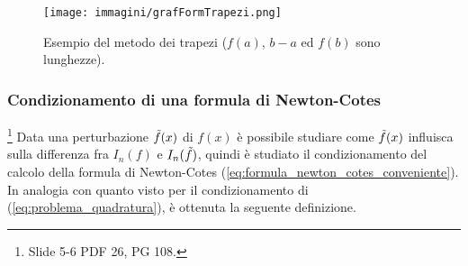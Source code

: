 \begin{figure}
    \centering
    \texttt{[image: immagini/grafFormTrapezi.png]}
    \caption{Esempio del metodo dei trapezi ($f(a)$, $b-a$ ed $f(b)$ sono lunghezze).}\label{fig:grafico_formula_trapezi}
\end{figure}

\subsubsection{Condizionamento di una formula di Newton-Cotes}
\footnote{Slide 5-6 PDF 26, PG 108.}
Data una perturbazione $\Tilde{f}(x)$ di $f(x)$ è possibile studiare come $\Tilde{f}(x)$ influisca sulla differenza fra $I_n(f)$ e $I_n(\Tilde{f})$, quindi è studiato il condizionamento del calcolo della formula di Newton-Cotes (\ref{eq:formula_newton_cotes_conveniente}). In analogia con quanto visto per il condizionamento di (\ref{eq:problema_quadratura}), è ottenuta la seguente definizione.

